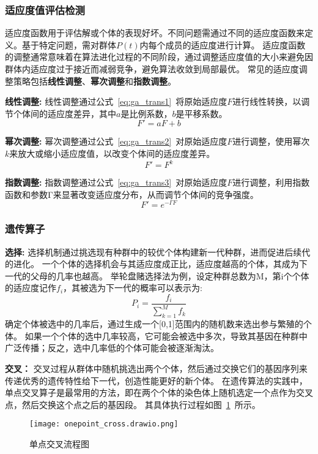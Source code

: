 \subsubsection*{适应度值评估检测}
适应度函数用于评估解或个体的表现好坏。不同问题需通过不同的适应度函数来定义。基于特定问题，需对群体$P(t)$内每个成员的适应度进行计算。
适应度函数的调整通常意味着在算法进化过程的不同阶段，通过调整适应度值的大小来避免因群体内适应度过于接近而减弱竞争，避免算法收敛到局部最优。
常见的适应度调整策略包括\textbf{线性调整}、\textbf{幂次调整}和\textbf{指数调整}。

  \textbf{线性调整:}
  线性调整通过公式~\ref{eq:ga_trans1}~将原始适应度$F$进行线性转换，以调节个体间的适应度差异，其中$a$是比例系数，$b$是平移系数。
    \begin{equation}
      \label{eq:ga_trans1}
      F' = aF + b
    \end{equation}
    
    
    
    \textbf{幂次调整:}
    幂次调整通过公式~\ref{eq:ga_trans2}~对原始适应度$F$进行调整，使用幂次$k$来放大或缩小适应度值，以改变个体间的适应度差异。
    \begin{equation}
      \label{eq:ga_trans2}
      F' = F^k
    \end{equation}
    
    \textbf{指数调整:}
    指数调整通过公式~\ref{eq:ga_trans3}~对原始适应度$F$进行调整，利用指数函数和参数Γ来显著改变适应度分布，从而调节个体间的竞争强度。
    \begin{equation}
      \label{eq:ga_trans3}
      F' = e^{-\Gamma F}
    \end{equation}

\subsubsection*{遗传算子}
\textbf{选择:}
选择机制通过挑选现有种群中的较优个体构建新一代种群，进而促进后续代的进化。
一个个体的选择机会与其适应度成正比，适应度越高的个体，其成为下一代的父母的几率也越高。
举轮盘赌选择法为例，设定种群总数为M，第i个个体的适应度记作$f_i$，其被选为下一代的概率可以表示为:
\begin{equation}
  \label{eq:selection}
  P_i = \frac{f_i}{\sum_{k=1}^{M} f_k}
\end{equation}
确定个体被选中的几率后，通过生成一个[0,1]范围内的随机数来选出参与繁殖的个体。
如果一个个体的选中几率较高，它可能会被选中多次，导致其基因在种群中广泛传播；反之，选中几率低的个体可能会被逐渐淘汰。

\textbf{交叉：}
交叉过程从群体中随机挑选出两个个体，然后通过交换它们的基因序列来传递优秀的遗传特性给下一代，创造性能更好的新个体。
在遗传算法的实践中，单点交叉算子是最常用的方法，即在两个个体的染色体上随机选定一个点作为交叉点，然后交换这个点之后的基因段。
其具体执行过程如图~\ref{fig:onepoint_corss}~所示。
\begin{figure}[htbp]
  \centering
  \texttt{[image: onepoint\_cross.drawio.png]}
  \caption{单点交叉流程图}
  \label{fig:onepoint_corss}
\end{figure}

